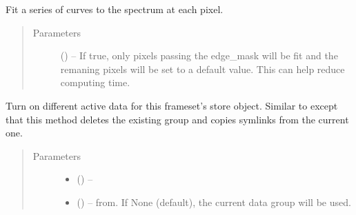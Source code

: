 \documentclass[letterpaper,10pt,english]{sphinxmanual}
\begin{document}
\begin{fulllineitems}
\begin{fulllineitems}
\begin{quote}
\begin{description}
\end{description}\end{quote}

\end{fulllineitems}


\begin{fulllineitems}
\label{\detokenize{xanespy:xanespy.xanes_frameset.XanesFrameset.fit_spectra}}
Fit a series of curves to the spectrum at each pixel.
\begin{quote}\begin{description}
\item[{Parameters}] \leavevmode
{} (\sphinxstyleliteralemphasis{, }) -- If true, only pixels passing the edge\_mask will be fit and
the remaning pixels will be set to a default value. This can
help reduce computing time.

\end{description}\end{quote}

\end{fulllineitems}


\begin{fulllineitems}
\label{\detokenize{xanespy:xanespy.xanes_frameset.XanesFrameset.fork_data_group}}
Turn on different active data for this frameset's store
object. Similar to  except that this method
deletes the existing group and copies symlinks from the current one.
\begin{quote}\begin{description}
\item[{Parameters}] \leavevmode\begin{itemize}
\item {} 
 (\sphinxstyleliteralemphasis{-}) -- 

\item {} 
 (\sphinxstyleliteralemphasis{-}) -- from. If None (default), the current data group will be
used.


\end{itemize}
\end{description}
\end{quote}
\end{fulllineitems}
\end{fulllineitems}
\end{document}
